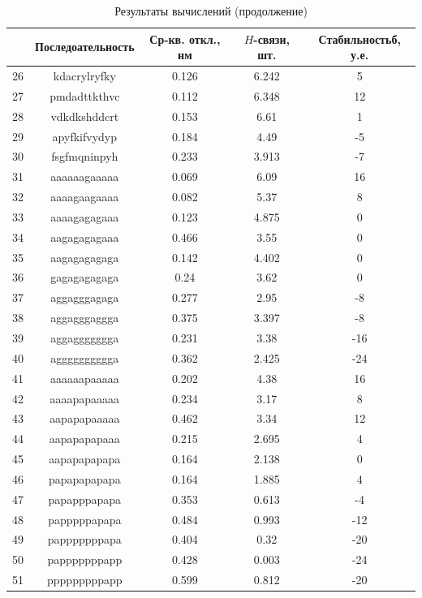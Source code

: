 \documentclass[
11pt,%
tightenlines,%
twoside,%
onecolumn,%
nofloats,%
nobibnotes,%
nofootinbib,%
superscriptaddress,%
noshowpacs,%
centertags]%
{revtex4}
\begin{document}
\begin{table}
	\begin{tabular}{|c|c|c|c|c|}
		\hline
		& Последоательность & Ср-кв. откл., нм & $H$-связи, шт. & Стабильностьб, у.е. \\ \hline 
		26 & kdacrylryfky & 0.126 & 6.242 & 5 \\ \hline 
		27 & pmdadttkthvc & 0.112 & 6.348 & 12 \\ \hline 
		28 & vdkdkshddcrt & 0.153 & 6.61 & 1 \\ \hline 
		29 & apyfkifvydyp & 0.184 & 4.49 & -5 \\ \hline 
		30 & fsgfmqninpyh & 0.233 & 3.913 & -7 \\ \hline 
		31 & aaaaaagaaaaa & 0.069 & 6.09 & 16 \\ \hline 
		32 & aaaagaagaaaa & 0.082 & 5.37 & 8 \\ \hline 
		33 & aaaagagagaaa & 0.123 & 4.875 & 0 \\ \hline 
		34 & aagagagagaaa & 0.466 & 3.55 & 0 \\ \hline 
		35 & aagagagagaga & 0.142 & 4.402 & 0 \\ \hline 
		36 & gagagagagaga & 0.24 & 3.62 & 0 \\ \hline 
		37 & aggagggagaga & 0.277 & 2.95 & -8 \\ \hline 
		38 & aggagggaggga & 0.375 & 3.397 & -8 \\ \hline 
		39 & aggaggggggga & 0.231 & 3.38 & -16 \\ \hline 
		40 & agggggggggga & 0.362 & 2.425 & -24 \\ \hline 
		41 & aaaaaapaaaaa & 0.202 & 4.38 & 16 \\ \hline 
		42 & aaaapapaaaaa & 0.234 & 3.17 & 8 \\ \hline 
		43 & aapapapaaaaa & 0.462 & 3.34 & 12 \\ \hline 
		44 & aapapapapaaa & 0.215 & 2.695 & 4 \\ \hline 
		45 & aapapapapapa & 0.164 & 2.138 & 0 \\ \hline 
		46 & papapapapapa & 0.164 & 1.885 & 4 \\ \hline 
		47 & papapppapapa & 0.353 & 0.613 & -4 \\ \hline 
		48 & papppppapapa & 0.484 & 0.993 & -12 \\ \hline 
		49 & papppppppapa & 0.404 & 0.32 & -20 \\ \hline 
		50 & papppppppapp & 0.428 & 0.003 & -24 \\ \hline 
		51 & pppppppppapp & 0.599 & 0.812 & -20 \\ \hline 
	\end{tabular}
	\caption{Результаты вычислений (продолжение)}
\end{table}
\end{document}

